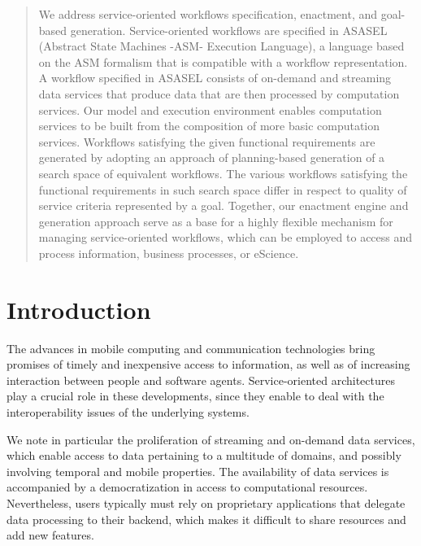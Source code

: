 \documentclass{acm_proc_article-sp}
\begin{document}


\maketitle              %

\begin{abstract}

We address service-oriented workflows specification, enactment, and goal-based generation. Service-oriented workflows are specified in ASASEL (Abstract State Machines -ASM- Execution Language), a language based on the ASM formalism that is compatible with a workflow representation. A workflow specified in ASASEL consists of on-demand and streaming data services that produce data that are then processed by computation services. Our model and execution environment enables computation services to be built from the composition of more basic computation services. Workflows satisfying the given functional requirements are generated by adopting an approach of planning-based generation of a search space of equivalent workflows. The various workflows satisfying the functional requirements in such search space differ in respect to quality of service criteria represented by a goal. Together, our enactment engine and generation approach serve as a base for a highly flexible mechanism for managing service-oriented workflows, which can be employed to access and process information, business processes, or eScience.

\end{abstract}
%
	
\section{Introduction}\label{sec:asasel:intro}

The advances in mobile computing and communication technologies bring promises of timely and inexpensive access to information, as well as of increasing interaction between people and software agents. Service-oriented architectures play a crucial role in these developments, since they enable to deal with the interoperability issues of the underlying systems.

We note in particular the proliferation of streaming and on-demand data services, which enable access to data pertaining to a multitude of domains, and possibly involving temporal and mobile properties. The availability of data services is accompanied by a democratization in access to computational resources. Nevertheless, users typically must rely on proprietary applications that delegate data processing to their backend, which makes it difficult to share resources and add new features.	
	
\end{document}
